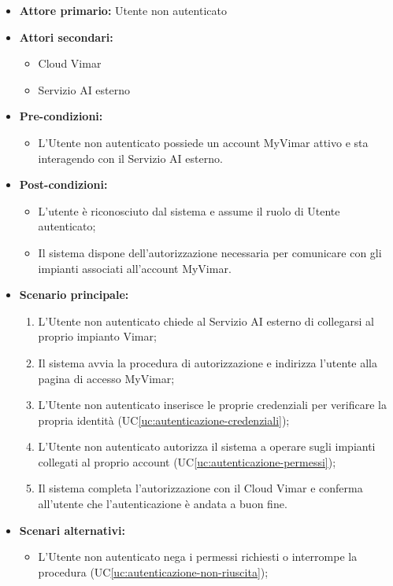 \documentclass[11pt, a4paper]{article}
\newcounter{uc}                            %
\newcommand{\ucref}[1]{UC\ref{uc:#1}}
\begin{document}
\begin{itemize}[label=\textbullet]
  \item \textbf{Attore primario:} Utente non autenticato
  \item \textbf{Attori secondari:}
  \begin{itemize}[label=‣]
    \item Cloud Vimar
    \item Servizio AI esterno
  \end{itemize}
  \item \textbf{Pre-condizioni:}
  \begin{itemize}[label=‣]
    \item L'Utente non autenticato possiede un account MyVimar attivo e sta interagendo con il Servizio AI esterno.
  \end{itemize}
  \item \textbf{Post-condizioni:}
  \begin{itemize}[label=‣]
    \item L'utente è riconosciuto dal sistema e assume il ruolo di Utente autenticato;
    \item Il sistema dispone dell'autorizzazione necessaria per comunicare con gli impianti associati all'account MyVimar.
  \end{itemize}
  \item \textbf{Scenario principale:}
  \begin{enumerate}
    \item L'Utente non autenticato chiede al Servizio AI esterno di collegarsi al proprio impianto Vimar;
    \item Il sistema avvia la procedura di autorizzazione e indirizza l'utente alla pagina di accesso MyVimar;
    \item L'Utente non autenticato inserisce le proprie credenziali per verificare la propria identità (\ucref{autenticazione-credenziali});
    \item L'Utente non autenticato autorizza il sistema a operare sugli impianti collegati al proprio account (\ucref{autenticazione-permessi});
    \item Il sistema completa l'autorizzazione con il Cloud Vimar e conferma all'utente che l'autenticazione è andata a buon fine.
  \end{enumerate}
  \item \textbf{Scenari alternativi:}
  \begin{itemize}[label=‣]
    \item L'Utente non autenticato nega i permessi richiesti o interrompe la procedura (\ucref{autenticazione-non-riuscita});

\end{itemize}
\end{itemize}
\end{document}
